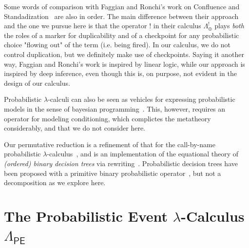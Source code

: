 \documentclass[runningheads,orivec]{llncs}
\theoremstyle{definition}
\theoremstyle{plain}
\newcommand\PEL{\Lambda_{\textsf{PE}}}
\newcommand\+[1][{}]{\kern1pt{\smallbin\oplus}_{#1}\kern1pt}
\newcommand\1{\bullet}
\newcommand\0{\circ}
\begin{document}
Some words of comparison with Faggian and Ronchi's work on Confluence and Standadization~\cite{FaggianRonchi19} are also in order. The main difference between their approach and the one we pursue here is that the operator $!$ in their calculus $\Lambda_\oplus^!$ plays \emph{both} the roles of a marker for duplicability and of a checkpoint for any probabilistic choice "flowing out" of the term (i.e. being fired). In our calculus, we do not control duplication, but we definitely make use of checkpoints. Saying it another way, Faggian and Ronchi's work is inspired by linear logic, while our approach is inspired by deep inference, even though this is, on purpose, not evident in the design of our calculus. 

Probabilistic $\lambda$-calculi can also be seen as vehicles for expressing probabilistic models in the sense of bayesian programming~\cite{Ramsey-Pfeffer-2002,BDLGS16}. This, however, requires an operator for modeling conditioning, which complictes the metatheory considerably, and that we do not consider here.

Our permutative reduction is a refinement of that for the call-by-name probabilistic $\lambda$-calculus~\cite{Leventis19}, and is an implementation of the equational theory of \emph{(ordered) binary decision trees} via rewriting~\cite{Zantema-Pol-2001}. Probabilistic decision trees have been proposed with a primitive binary probabilistic operator~\cite{Manber-Tompa-1982}, but not a decomposition as we explore here.



\section{\texorpdfstring{The Probabilistic Event $\lambda$-Calculus $\PEL$}{The Probabilistic Event Lambda-Calculus PEL}}
\label{sec:PEL}
\end{document}
